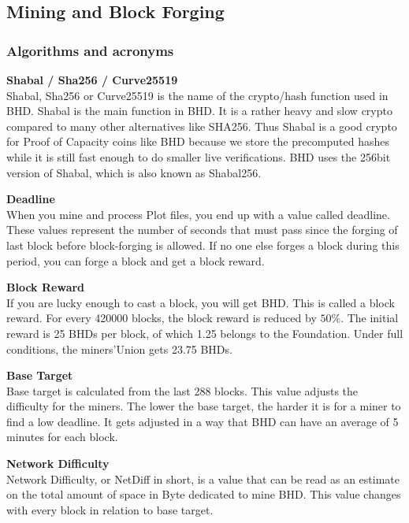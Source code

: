 \subsection{Mining and Block Forging}
\subsubsection{Algorithms and acronyms}
\begin{flushleft}
    \textbf{Shabal / Sha256 / Curve25519}\\
    Shabal, Sha256 or Curve25519 is the name of the crypto/hash function used in BHD. Shabal is the main function in BHD. It is a rather heavy and slow crypto compared to many other alternatives like SHA256. Thus Shabal is a good crypto for Proof of Capacity coins like BHD because we store the precomputed hashes while it is still fast enough to do smaller live verifications. BHD uses the 256bit version of Shabal, which is also known as Shabal256.
\end{flushleft}
\begin{flushleft}
    \textbf{Deadline}\\
    When you mine and process Plot files, you end up with a value called deadline. These values represent the number of seconds that must pass since the forging of last block before block-forging is allowed. If no one else forges a block during this period, you can forge a block and get a block reward.
\end{flushleft}
\begin{flushleft}
    \textbf{Block Reward}\\
    If you are lucky enough to cast a block, you will get BHD. This is called a block reward. For every 420000 blocks, the block reward is reduced by $50\%$. The initial reward is 25 BHDs per block, of which 1.25 belongs to the Foundation. Under full conditions, the miners'Union gets 23.75 BHDs.
\end{flushleft}
\begin{flushleft}
    \textbf{Base Target}\\
    Base target is calculated from the last 288 blocks. This value adjusts the difficulty for the miners. The lower the base target, the harder it is for a miner to find a low deadline. It gets adjusted in a way that BHD can have an average of 5 minutes for each block.
\end{flushleft}
\begin{flushleft}
    \textbf{Network Difficulty}\\
    Network Difficulty, or NetDiff in short, is a value that can be read as an estimate on the total amount of space in Byte dedicated to mine BHD. This value changes with every block in relation to base target.
\end{flushleft}
